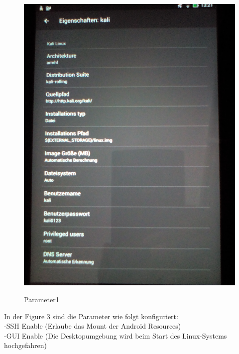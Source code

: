 \documentclass[11pt,a4paper]{article}
\begin{document}
\begin{figure}[!h]
\begin{center} \includegraphics[scale=0.1]{./Image/img2}  \\
\caption{Parameter1}
\end{center}
\end{figure}

In der Figure 3 sind die Parameter wie folgt konfiguriert: \\
-SSH Enable (Erlaube das Mount der Android Resources) \\
-GUI Enable (Die Desktopumgebung wird beim Start des Linux-Systems hochgefahren) \\
\end{document}
